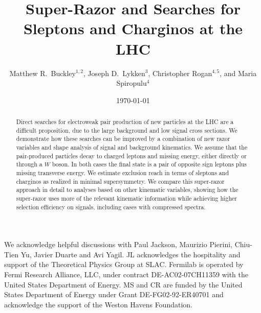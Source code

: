 \documentclass[aps,prd,preprintnumbers,groupedaddress,nofootinbib]{revtex4}
\begin{document}
\title{Super-Razor and Searches for Sleptons and Charginos at the LHC}

\author{Matthew R.~Buckley$^{1,2}$, Joseph D.~Lykken$^3$, Christopher Rogan$^{4,5}$, and Maria Spiropulu$^4$}

\date{\today}

\begin{abstract}
Direct searches for electroweak pair production of new particles at the LHC are a difficult proposition, due to the large background and low signal cross sections. We demonstrate how these searches can be improved by a combination of new razor variables and shape analysis of signal and background kinematics. We assume that the pair-produced particles decay to charged leptons and missing energy, either directly or through a $W$ boson. In both cases the final state is a pair of opposite sign leptons plus missing transverse energy. We estimate exclusion reach in terms of sleptons and charginos as realized in minimal supersymmetry. We compare this super-razor approach in detail to analyses based on other kinematic variables, showing how the
super-razor uses more of the relevant kinematic information while achieving higher selection efficiency on
signals, including cases with compressed spectra.
\end{abstract}

\maketitle







\begin{acknowledgments}
We acknowledge helpful discussions with Paul Jackson, Maurizio Pierini, Chiu-Tien Yu, Javier Duarte and Avi Yagil.   
JL acknowledges the hospitality and support of the Theoretical Physics Group at SLAC.
Fermilab is operated by Fermi Research Alliance, LLC, under contract DE-AC02-07CH11359 with the United States Department of Energy. MS and CR are funded by the United States Department of Energy under Grant DE-FG02-92-ER40701 and acknowledge the support of the Weston Havens Foundation.  
\end{acknowledgments}


\end{document}

